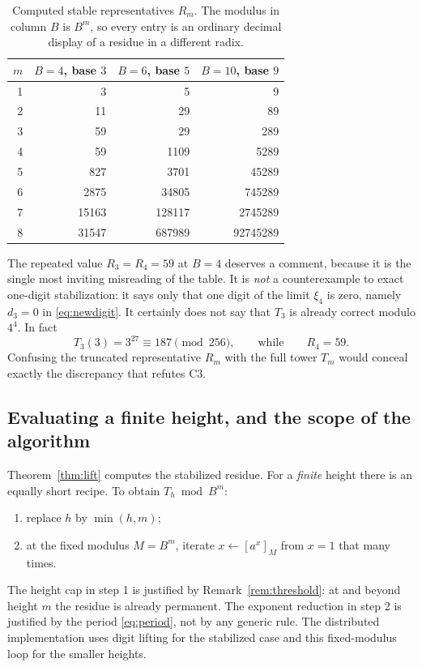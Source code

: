 \documentclass[11pt,letterpaper]{article}
\numberwithin{equation}{section}
\theoremstyle{definition}
\theoremstyle{remark}
\newcommand{\res}[2]{\left[#1\right]_{#2}}
\begin{document}
\begin{table}[htbp]
\centering
\caption{Computed stable representatives $R_m$. The modulus in column $B$ is $B^m$, so every entry is an ordinary decimal display of a residue in a different radix.}\label{tab:residues}
\begin{tabular}{rrrr}
\toprule
$m$&$B=4$, base $3$&$B=6$, base $5$&$B=10$, base $9$\\
\midrule
1&3&5&9\\
2&11&29&89\\
3&59&29&289\\
4&59&1109&5289\\
5&827&3701&45289\\
6&2875&34805&745289\\
7&15163&128117&2745289\\
8&31547&687989&92745289\\
\bottomrule
\end{tabular}
\end{table}

The repeated value $R_3=R_4=59$ at $B=4$ deserves a comment, because it is the single most inviting misreading of the table. It is \emph{not} a counterexample to exact one-digit stabilization: it says only that one digit of the limit $\xi_4$ is zero, namely $d_3=0$ in \eqref{eq:newdigit}. It certainly does not say that $T_3$ is already correct modulo $4^4$. In fact
\[
 T_3(3)=3^{27}\equiv187\pmod{256},\qquad\text{while}\qquad R_4=59 .
\]
Confusing the truncated representative $R_m$ with the full tower $T_m$ would conceal exactly the discrepancy that refutes C3.

\subsection{Evaluating a finite height, and the scope of the algorithm}\label{sec:finite-height}

Theorem~\ref{thm:lift} computes the stabilized residue. For a \emph{finite} height there is an equally short recipe. To obtain $T_h\bmod B^m$:
\begin{enumerate}[leftmargin=7mm,itemsep=2pt]
\item replace $h$ by $\min(h,m)$;
\item at the fixed modulus $M=B^m$, iterate $x\leftarrow\res{a^x}{M}$ from $x=1$ that many times.
\end{enumerate}
The height cap in step 1 is justified by Remark~\ref{rem:threshold}: at and beyond height $m$ the residue is already permanent. The exponent reduction in step 2 is justified by the period \eqref{eq:period}, not by any generic rule. The distributed implementation uses digit lifting for the stabilized case and this fixed-modulus loop for the smaller heights.
\end{document}

